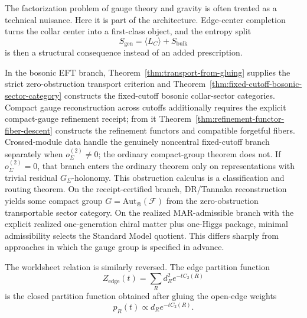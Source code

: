 \documentclass[11pt]{article}
\begin{document}
The factorization problem of gauge theory and gravity is often treated as a technical nuisance. Here it is part of the architecture. Edge-center completion turns the collar center into a first-class object, and the entropy split
\[
S_{\mathrm{gen}}=\langle L_C\rangle + S_{\mathrm{bulk}}
\]
is then a structural consequence instead of an added prescription.

In the bosonic EFT branch, Theorem~\ref{thm:transport-from-gluing} supplies the strict zero-obstruction transport criterion and Theorem~\ref{thm:fixed-cutoff-bosonic-sector-category} constructs the fixed-cutoff bosonic collar-sector categories. Compact gauge reconstruction across cutoffs additionally requires the explicit compact-gauge refinement receipt; from it Theorem~\ref{thm:refinement-functor-fiber-descent} constructs the refinement functors and compatible forgetful fibers. Crossed-module data handle the genuinely noncentral fixed-cutoff branch separately when \(o^{(2)}_\Sigma\ne0\); the ordinary compact-group theorem does not. If \(o^{(2)}_\Sigma=0\), that branch enters the ordinary theorem only on representations with trivial residual \(G_\Sigma\)-holonomy. This obstruction calculus is a classification and routing theorem. On the receipt-certified branch, DR/Tannaka reconstruction yields some compact group \(G=\mathrm{Aut}_\otimes(\mathcal F)\) from the zero-obstruction transportable sector category. On the realized MAR-admissible branch with the explicit realized one-generation chiral matter plus one-Higgs package, minimal admissibility selects the Standard Model quotient. This differs sharply from approaches in which the gauge group is specified in advance.

The worldsheet relation is similarly reversed. The edge partition function
\[
Z_{\mathrm{edge}}(t)=\sum_R d_R^2 e^{-t C_2(R)}
\]
is the closed partition function obtained after gluing the open-edge weights
\[
p_R(t)\propto d_R e^{-tC_2(R)}.
\]
\end{document}

